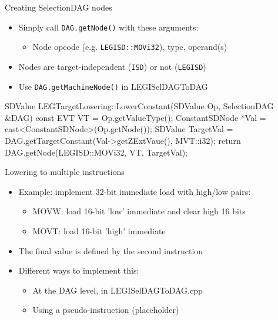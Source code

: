 
\begin{frame}[fragile]{Creating SelectionDAG nodes}

\begin{itemize}
    \item Simply call \texttt{DAG.getNode()} with these arguments:
    \begin{itemize}
        \item Node opcode (e.g. \texttt{LEGISD::MOVi32}), type, operand(s)
    \end{itemize}
    \item Nodes are target-independent (\texttt{ISD}) or not (\texttt{LEGISD})
    \item Use \texttt{DAG.getMachineNode()} in LEGISelDAGToDAG
\end{itemize}

\begin{codebox}
SDValue LEGTargetLowering::LowerConstant(SDValue Op,
                                         SelectionDAG &DAG) const {
  EVT VT = Op.getValueType();
  ConstantSDNode *Val = cast<ConstantSDNode>(Op.getNode());
  SDValue TargetVal = DAG.getTargetConstant(Val->getZExtVaue(),
                                            MVT::i32);
  return DAG.getNode(LEGISD::MOVi32, VT, TargetVal);
}
\end{codebox}

\end{frame}


\begin{frame}{Lowering to multiple instructions}

\begin{itemize}
    \item Example: implement 32-bit immediate load with high/low pairs:
    \begin{itemize}
        \item MOVW: load 16-bit 'low' immediate and clear high 16 bits
        \item MOVT: load 16-bit 'high' immediate
    \end{itemize}
    \item The final value is defined by the second instruction
    \item Different ways to implement this:
    \begin{itemize}
        \item At the DAG level, in LEGISelDAGToDAG.cpp
        \item Using a pseudo-instruction (placeholder)
    \end{itemize}
\end{itemize}

\end{frame}

